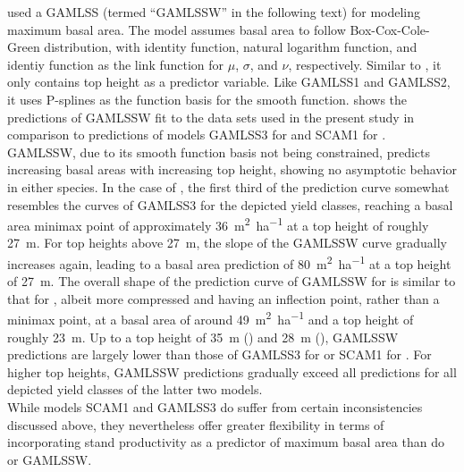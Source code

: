 \textcite{Woerdehoff2016} used a GAMLSS (termed ``GAMLSSW'' in the following text) for modeling maximum basal area.  The model assumes basal area to follow Box-Cox-Cole-Green distribution, with identity function, natural logarithm function, and identiy function as the link function for \(\mu\), \(\sigma\), and \(\nu\), respectively.  Similar to , it only contains top height as a predictor variable.  Like GAMLSS1 and GAMLSS2, it uses P-splines as the function basis for the smooth function.   shows the predictions of GAMLSSW fit to the data sets used in the present study in comparison to predictions of models GAMLSS3 for \Beech{} and SCAM1 for \Spruce{}.  GAMLSSW, due to its smooth function basis not being constrained, predicts increasing basal areas with increasing top height, showing no asymptotic behavior in either species.  In the case of \Beech{}, the first third of the prediction curve somewhat resembles the curves of GAMLSS3 for the depicted yield classes, reaching a basal area minimax point of approximately \SI{36}{\square\meter\per\hectare} at a top height of roughly \SI{27}{\meter}.  For top heights above \SI{27}{\meter}, the slope of the GAMLSSW curve gradually increases again, leading to a basal area prediction of \SI{80}{\square\meter\per\hectare} at a top height of \SI{27}{\meter}.  The overall shape of the  prediction curve of GAMLSSW for \Spruce{} is similar to that for \Beech{}, albeit more compressed and having an inflection point, rather than a minimax point, at a basal area of around \SI{49}{\square\meter\per\hectare} and a top height of roughly \SI{23}{\meter}.  Up to a top height of \SI{35}{\meter} (\Beech{}) and \SI{28}{\meter} (\Spruce{}), GAMLSSW predictions are largely lower than those of GAMLSS3 for \Beech{} or SCAM1 for \Spruce{}.  For higher top heights, GAMLSSW predictions gradually exceed all predictions for all depicted yield classes of the latter two models.  \\
While models SCAM1 and GAMLSS3 do suffer from certain inconsistencies discussed above, they nevertheless offer greater flexibility in terms of incorporating stand productivity as a predictor of maximum basal area than do  or GAMLSSW.

